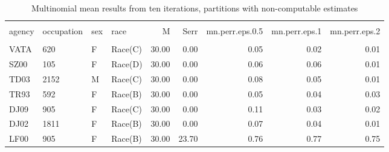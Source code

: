\documentclass[10pt, letterpaper]{article}
\begin{document}
\begin{spacing}{1.0}
\begin{table}[h!]
    \centering
    \caption{Multinomial mean results from ten iterations, partitions with non-computable estimates}
    \label{table:mnerr}
    \begin{tabular}{llllrrrrr}
        \hline\\[-10pt]
        agency & occupation & sex & race & M & Serr & mn.perr.eps.0.5 & mn.perr.eps.1 & mn.perr.eps.2 \\ 
        \hline\\[-6pt]
        VATA & 620 & F & Race(C) & 30.00 & 0.00 & 0.05 & 0.02 & 0.01 \\ 
        SZ00 & 105 & F & Race(D) & 30.00 & 0.00 & 0.06 & 0.06 & 0.01 \\ 
        TD03 & 2152 & M & Race(C) & 30.00 & 0.00 & 0.08 & 0.05 & 0.01 \\ 
        TR93 & 592 & F & Race(B) & 30.00 & 0.00 & 0.05 & 0.04 & 0.03 \\ 
        DJ09 & 905 & F & Race(C) & 30.00 & 0.00 & 0.11 & 0.03 & 0.02 \\ 
        DJ02 & 1811 & F & Race(B) & 30.00 & 0.00 & 0.07 & 0.04 & 0.01 \\ 
        LF00 & 905 & F & Race(B) & 30.00 & 23.70 & 0.76 & 0.77 & 0.75 \\ 
        \hline
    \end{tabular}
\end{table}

\clearpage

\end{spacing}
  
\end{document}
